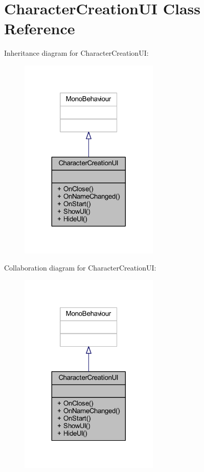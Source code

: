 \hypertarget{class_character_creation_u_i}{}\section{Character\+Creation\+UI Class Reference}
\label{class_character_creation_u_i}


Inheritance diagram for Character\+Creation\+UI\+:
\nopagebreak
\begin{figure}[H]
\begin{center}
\leavevmode
\includegraphics[width=188pt]{class_character_creation_u_i__inherit__graph}
\end{center}
\end{figure}


Collaboration diagram for Character\+Creation\+UI\+:
\nopagebreak
\begin{figure}[H]
\begin{center}
\leavevmode
\includegraphics[width=188pt]{class_character_creation_u_i__coll__graph}
\end{center}
\end{figure}

